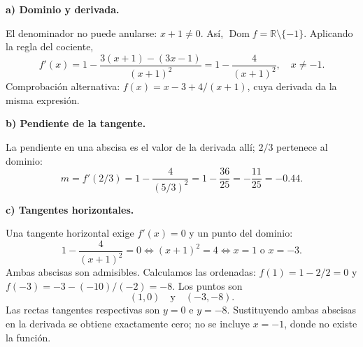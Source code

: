 \textbf{a) Dominio y derivada.}\par\nopagebreak[4]
El denominador no puede anularse: $x+1\ne0$. Así, $\operatorname{Dom}f=\mathbb R\setminus\{-1\}$. Aplicando la regla del cociente,
\[
f'(x)=1-\frac{3(x+1)-(3x-1)}{(x+1)^2}
=\boxed{1-\frac4{(x+1)^2}},\quad x\ne-1.
\]
Comprobación alternativa: $f(x)=x-3+4/(x+1)$, cuya derivada da la misma expresión.

\textbf{b) Pendiente de la tangente.}\par\nopagebreak[4]
La pendiente en una abscisa es el valor de la derivada allí; $2/3$ pertenece al dominio:
\[
m=f'(2/3)=1-\frac4{(5/3)^2}=1-\frac{36}{25}=\boxed{-\frac{11}{25}=-0.44}.
\]

\textbf{c) Tangentes horizontales.}\par\nopagebreak[4]
Una tangente horizontal exige $f'(x)=0$ y un punto del dominio:
\[
1-\frac4{(x+1)^2}=0\iff (x+1)^2=4\iff x=1\text{ o }x=-3.
\]
Ambas abscisas son admisibles. Calculamos las ordenadas: $f(1)=1-2/2=0$ y $f(-3)=-3-(-10)/(-2)=-8$. Los puntos son
\[
\boxed{(1,0)\quad\text{y}\quad(-3,-8).}
\]
Las rectas tangentes respectivas son $y=0$ e $y=-8$. Sustituyendo ambas abscisas en la derivada se obtiene exactamente cero; no se incluye $x=-1$, donde no existe la función.

